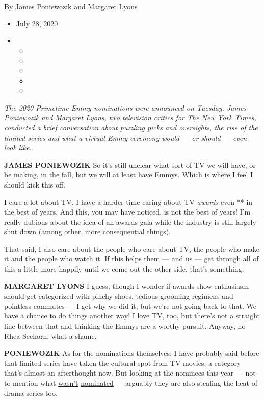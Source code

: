 By \href{https://www.nytimes.com/by/james-poniewozik}{James Poniewozik}
and \href{https://www.nytimes.com/by/margaret-lyons}{Margaret Lyons}

\begin{itemize}
\item
  July 28, 2020
\item
  \begin{itemize}
  \item
  \item
  \item
  \item
  \item
  \end{itemize}
\end{itemize}

\emph{The 2020 Primetime Emmy nominations were announced on Tuesday.
James Poniewozik and Margaret Lyons, two television critics for The New
York Times, conducted a brief conversation about puzzling picks and
oversights, the rise of the limited series and what a virtual Emmy
ceremony would --- or should --- even look like.}

\textbf{JAMES PONIEWOZIK} So it's still unclear what sort of TV we will
have, or be making, in the fall, but we will at least have Emmys. Which
is where I feel I should kick this off.

I care a lot about TV. I have a harder time caring about TV
\emph{awards} even ** in the best of years. And this, you may have
noticed, is not the best of years! I'm really dubious about the idea of
an awards gala while the industry is still largely shut down (among
other, more consequential things).

That said, I also care about the people who care about TV, the people
who make it and the people who watch it. If this helps them --- and us
--- get through all of this a little more happily until we come out the
other side, that's something.

\textbf{MARGARET LYONS} I guess, though I wonder if awards show
enthusiasm should get categorized with pinchy shoes, tedious grooming
regimens and pointless commutes --- I get why we did it, but we're not
going back to that. We have a chance to do things another way! I love
TV, too, but there's not a straight line between that and thinking the
Emmys are a worthy pursuit. Anyway, no Rhea Seehorn, what a shame.

\textbf{PONIEWOZIK} As for the nominations themselves: I have probably
said before that limited series have taken the cultural spot from TV
movies, a category that's almost an afterthought now. But looking at the
nominees this year --- not to mention what
\href{https://www.nytimes.com/2020/04/28/arts/television/normal-people-review.html}{wasn't}
\href{https://www.nytimes.com/2019/09/13/arts/television/review-netflix-unbelievable.html}{nominated}
--- arguably they are also stealing the heat of drama series too.

